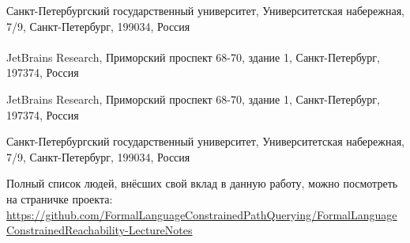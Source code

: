 
\begin{description}[style=nextline]
      \item[Семён Григорьев]
            Санкт-Петербургский государственный университет, Университетская набережная, 7/9, Санкт-Петербург, 199034, Россия \\
            \\
            JetBrains Research, Приморский проспект 68-70, здание 1, Санкт-Петербург, 197374, Россия \\
      \item[Екатерина Вербицкая]
            JetBrains Research, Приморский проспект 68-70, здание 1, Санкт-Петербург, 197374, Россия \\
      \item[Дмитрий Кутленков]
            Санкт-Петербургский государственный университет, Университетская набережная, 7/9, Санкт-Петербург, 199034, Россия \\
      \item[]
\end{description}

Полный список людей, внёсших свой вклад в данную работу, можно посмотреть на страничке проекта:
\url{https://github.com/FormalLanguageConstrainedPathQuerying/FormalLanguageConstrainedReachability-LectureNotes}
